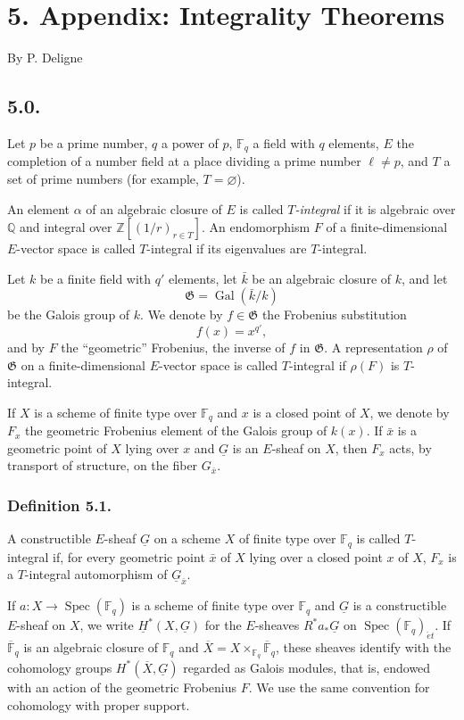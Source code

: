 \section*{5. Appendix: Integrality Theorems}

\begin{center}
By P. Deligne
\end{center}

\subsection*{5.0.}
Let $p$ be a prime number, $q$ a power of $p$, $\mathbb F_q$ a field with
$q$ elements, $E$ the completion of a number field at a place dividing a
prime number $\ell\ne p$, and $T$ a set of prime numbers (for example,
$T=\varnothing$).

An element $\alpha$ of an algebraic closure of $E$ is called
\emph{$T$-integral} if it is algebraic over $\mathbb Q$ and integral over
$\mathbb Z[(1/r)_{r\in T}]$.  An endomorphism $F$ of a finite-dimensional
$E$-vector space is called $T$-integral if its eigenvalues are $T$-integral.

Let $k$ be a finite field with $q'$ elements, let $\bar k$ be an algebraic
closure of $k$, and let
\[
\mathfrak G=\operatorname{Gal}(\bar k/k)
\]
be the Galois group of $k$.  We denote by $f\in\mathfrak G$ the Frobenius
substitution
\[
f(x)=x^{q'},
\]
and by $F$ the ``geometric'' Frobenius, the inverse of $f$ in $\mathfrak G$.
A representation $\rho$ of $\mathfrak G$ on a finite-dimensional
$E$-vector space is called $T$-integral if $\rho(F)$ is $T$-integral.

If $X$ is a scheme of finite type over $\mathbb F_q$ and $x$ is a closed
point of $X$, we denote by $F_x$ the geometric Frobenius element of the
Galois group of $k(x)$.  If $\bar x$ is a geometric point of $X$ lying over
$x$ and $\underline G$ is an $E$-sheaf on $X$, then $F_x$ acts, by transport
of structure, on the fiber $G_{\bar x}$.

\subsubsection*{Definition 5.1.}
A constructible $E$-sheaf $\underline G$ on a scheme $X$ of finite type over
$\mathbb F_q$ is called $T$-integral if, for every geometric point $\bar x$
of $X$ lying over a closed point $x$ of $X$, $F_x$ is a $T$-integral
automorphism of $\underline G_{\bar x}$.

If $a:X\longrightarrow\operatorname{Spec}(\mathbb F_q)$ is a scheme of
finite type over $\mathbb F_q$ and $\underline G$ is a constructible
$E$-sheaf on $X$, we write $\underline H^*(X,\underline G)$ for the
$E$-sheaves $R^*a_*\underline G$ on
$\operatorname{Spec}(\mathbb F_q)_{\acute e t}$.  If
$\overline{\mathbb F}_q$ is an algebraic closure of $\mathbb F_q$ and
$\overline X=X\times_{\mathbb F_q}\overline{\mathbb F}_q$, these sheaves
identify with the cohomology groups $H^*(\overline X,\underline G)$ regarded
as Galois modules, that is, endowed with an action of the geometric
Frobenius $F$.  We use the same convention for cohomology with proper
support.

